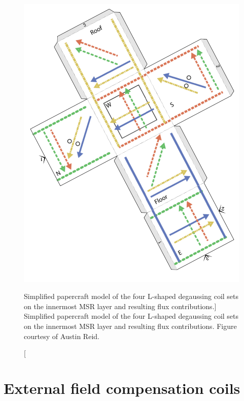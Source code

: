 \begin{figure}
    \centering
    \includegraphics[width=\textwidth]{figures/L5-papercube.pdf}
    \caption
    [Simplified papercraft model of the four L-shaped degaussing coil sets on the innermost MSR layer and resulting flux contributions.]
    {Simplified papercraft model of the four L-shaped degaussing coil sets on the innermost MSR layer and resulting flux contributions. Figure courtesy of Austin Reid.}
    \label{fig:degaussing-paper-cube}
\end{figure}


\section{External field compensation coils}\label{sec:field-cage}


